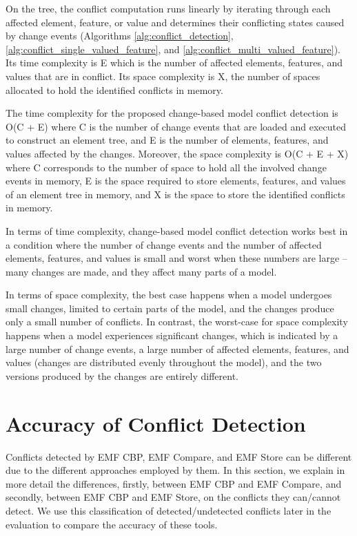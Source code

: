On the tree, the conflict computation runs linearly by iterating through each affected element, feature, or value and determines their conflicting states caused by change events (Algorithms \ref{alg:conflict_detection}, \ref{alg:conflict_single_valued_feature}, and \ref{alg:conflict_multi_valued_feature}). Its time complexity is \textsf{E} which is the number of affected elements, features, and values that are in conflict. Its space complexity is \textsf{X}, the number of spaces allocated to hold the identified conflicts in memory. 

The time complexity for the proposed change-based model conflict detection is \textsf{O}(\textsf{C} + \textsf{E}) where \textsf{C} is the number of change events that are loaded and executed to construct an element tree, and \textsf{E} is the number of elements, features, and values affected by the changes. Moreover, the space complexity is \textsf{O}(\textsf{C} + \textsf{E} + \textsf{X}) where \textsf{C} corresponds to the number of space to hold all the involved change events in memory, \textsf{E} is the space required to store elements, features, and values of an element tree in memory, and \textsf{X} is the space to store the identified conflicts in memory.

In terms of time complexity, change-based model conflict detection works best in a condition where the number of change events and the number of affected elements, features, and values is small and worst when these numbers are large -- many changes are made, and they affect many parts of a model. 

In terms of space complexity, the best case happens when a model undergoes small changes, limited to certain parts of the model, and the changes produce only a small number of conflicts. In contrast, the worst-case for space complexity happens when a model experiences significant changes, which is indicated by a large number of change events, a large number of affected elements, features, and values (changes are distributed evenly throughout the model), and the two versions produced by the changes are entirely different.

\section{Accuracy of Conflict Detection}
\label{sec:accuracy_of_conflict_detection}
Conflicts detected by EMF CBP, EMF Compare, and EMF Store can be different due to the different approaches employed by them. In this section, we explain in more detail the differences, firstly, between EMF CBP and EMF Compare, and secondly, between EMF CBP and EMF Store, on the conflicts they can/cannot detect. We use this classification of detected/undetected conflicts later in the evaluation to compare the accuracy of these tools.

